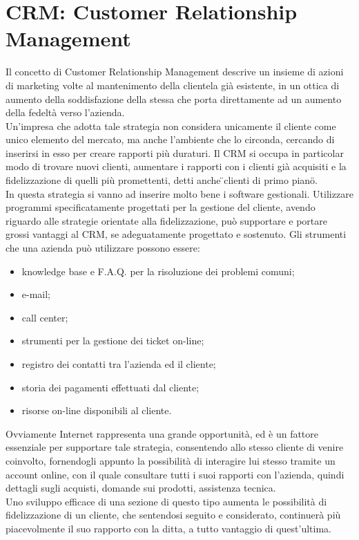 \section{CRM: Customer Relationship Management}
Il concetto di Customer Relationship Management descrive un insieme di azioni di marketing volte al mantenimento della clientela gi\` a esistente, in un ottica di aumento della soddisfazione della stessa che porta direttamente ad un aumento della fedelt\` a verso l'azienda.  \\
Un'impresa che adotta tale strategia non considera unicamente il cliente come unico elemento del mercato, ma anche l'ambiente che lo circonda, cercando di inserirsi in esso per creare rapporti pi\` u duraturi. Il CRM si occupa in particolar modo di trovare nuovi clienti, aumentare i rapporti con i clienti gi\`a  acquisiti e la fidelizzazione di quelli pi\` u promettenti, detti anche \"{}clienti di primo piano\"{}.  \\
In questa strategia si vanno ad inserire molto bene i software gestionali. Utilizzare programmi specificatamente progettati per la gestione del cliente, avendo riguardo alle strategie orientate alla fidelizzazione, pu\` o supportare e portare grossi vantaggi al CRM, se adeguatamente progettato e sostenuto. Gli strumenti che una azienda pu\` o utilizzare possono essere: 
  \begin{itemize}
    \item  knowledge base e F.A.Q. per la risoluzione dei problemi comuni;
    \item  e-mail;
    \item  call center;
    \item  strumenti per la gestione dei ticket on-line;
    \item  registro dei contatti tra l'azienda ed il cliente;
    \item  storia dei pagamenti effettuati dal cliente;
    \item  risorse on-line disponibili al cliente.
  \end{itemize}
\noindent
Ovviamente Internet rappresenta una grande opportunit\`a, ed \`e un fattore essenziale per supportare tale strategia, consentendo allo stesso cliente di venire coinvolto, fornendogli appunto la possibilit\`a di interagire lui stesso tramite un account online, con il quale consultare tutti i suoi rapporti con l'azienda, quindi dettagli sugli acquisti, domande sui prodotti, assistenza tecnica. \\
Uno sviluppo efficace di una sezione di questo tipo aumenta le possibilit\`a di fidelizzazione di un cliente, che sentendosi seguito e considerato, continuer\`a pi\`u piacevolmente il suo rapporto con la ditta, a tutto vantaggio di quest'ultima. 

